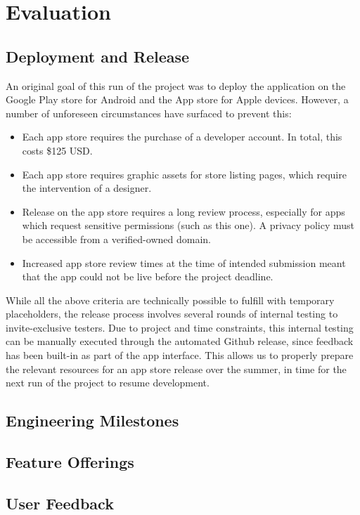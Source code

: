 \chapter{Evaluation}
\section{Deployment and Release}
An original goal of this run of the project was to deploy the application on the Google Play store for Android and the App store for Apple devices. However, a number of unforeseen circumstances have surfaced to prevent this:

\begin{itemize}
	\item Each app store requires the purchase of a developer account. In total, this costs \$125 USD.
	\item Each app store requires graphic assets for store listing pages, which require the intervention of a designer.
	\item Release on the app store requires a long review process, especially for apps which request sensitive permissions (such as this one). A privacy policy must be accessible from a verified-owned domain. 
	\item Increased app store review times at the time of intended submission meant that the app could not be live before the project deadline.
\end{itemize}

While all the above criteria are technically possible to fulfill with temporary placeholders, the release process involves several rounds of internal testing to invite-exclusive testers. Due to project and time constraints, this internal testing can be manually executed through the automated Github release, since feedback has been built-in as part of the app interface. This allows us to properly prepare the relevant resources for an app store release over the summer, in time for the next run of the project to resume development.

\section{Engineering Milestones}

\section{Feature Offerings}

\section{User Feedback}